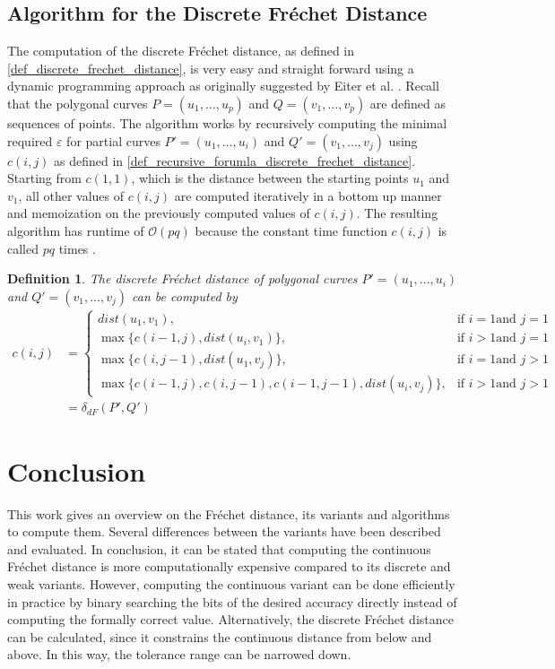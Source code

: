 \documentclass[
oneside,
fontsize=11pt
]{scrartcl}
\newtheorem{mydef}{Definition}
\begin{document}
\subsection{Algorithm for the Discrete Fréchet Distance}
\label{sec_discrete_algorithm}
The computation of the discrete Fréchet distance, as defined in \autoref{def_discrete_frechet_distance}, is very easy and straight forward 
using a dynamic programming approach as originally suggested by Eiter et al. \cite{eiter_computing_1994}.
Recall that the polygonal curves $P = (u_1, \dots, u_p)$ and $Q = (v_1, \dots, v_p)$ are defined as sequences of points.
The algorithm works by recursively computing the minimal required $\varepsilon$ for partial curves 
$P' = (u_1, \dots, u_i)$ and $Q' = (v_1, \dots, v_j)$
using $c(i,j)$ as defined in \autoref{def_recursive_forumla_discrete_frechet_distance}.
Starting from $c(1,1)$, which is the distance between the starting points $u_1$ and $v_1$,
all other values of $c(i,j)$ are computed iteratively in a bottom up manner 
and memoization on the previously computed values of $c(i,j)$.
The resulting algorithm has runtime of $\mathcal{O}(pq)$
because the constant time function $c(i,j)$ is called $pq$ times \cite{eiter_computing_1994}.

\begin{mydef}
  \label{def_recursive_forumla_discrete_frechet_distance}
  The discrete Fréchet distance of polygonal curves $P' = (u_1, \dots, u_i)$ and $Q' = (v_1, \dots, v_j)$
  can be computed by
  \begin{align*}
    c(i,j) &= \begin{cases}
      dist(u_1, v_1), &\text{if } i=1 \text{and } j=1 \\
      \max \{c(i-1,j), dist(u_i, v_1)\}, &\text{if } i>1 \text{and } j=1 \\
      \max \{c(i,j-1), dist(u_1, v_j)\}, &\text{if } i=1 \text{and } j>1 \\
      \max \{c(i-1,j), c(i,j-1), c(i-1,j-1), dist(u_i, v_j)\}, &\text{if } i>1 \text{and } j>1
    \end{cases} \\
    &= \delta_{dF}(P',Q')
  \end{align*}
\end{mydef}

\section{Conclusion}
This work gives an overview on the Fréchet distance, 
its variants and algorithms to compute them. 
Several differences between the variants have been described 
and evaluated. 
In conclusion, it can be stated that computing the continuous 
Fréchet distance is more computationally expensive compared 
to its discrete and weak variants.
However, computing the continuous variant can be done efficiently
in practice by binary searching the bits of the desired accuracy directly
instead of computing the formally correct value. 
Alternatively, the discrete Fréchet distance can be calculated, 
since it constrains the continuous distance 
from below and above. 
In this way, the tolerance range can be narrowed down.
\end{document}
